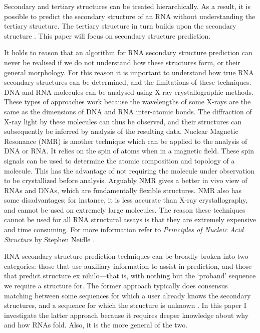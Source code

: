 \documentclass{cshonours}
\begin{document}
Secondary and tertiary structures can be treated hierarchically. As a result, it is possible to predict the secondary structure of an RNA without understanding the tertiary structure. The tertiary structure in turn builds upon the secondary structure \cite{tinoco1999rna}. This paper will focus on secondary structure prediction.

It holds to reason that an algorithm for RNA secondary structure prediction can never be realised if we do not understand how these structures form, or their general morphology. For this reason it is important to understand how true RNA secondary structures can be determined, and the limitations of these techniques. DNA and RNA molecules can be analysed using X-ray crystallographic methods. These types of approaches work because the wavelengths of some X-rays are the same as the dimensions of DNA and RNA inter-atomic bonds. The diffraction of X-ray light by these molecules can thus be observed, and their structures can subsequently be inferred by analysis of the resulting data. Nuclear Magnetic Resonance (NMR) is another technique which can be applied to the analysis of DNA or RNA. It relies on the spin of atoms when in a magnetic field. These spin signals can be used to determine the atomic composition and topology of a molecule. This has the advantage of not requiring the molecule under observation to be crystallized before analysis. Arguably NMR gives a better in vivo view of RNAs and DNAs, which are fundamentally flexible structures. NMR also has some disadvantages; for instance, it is less accurate than X-ray crystallography, and cannot be used on extremely large molecules. The reason these techniques cannot be used for all RNA structural assays is that they are extremely expensive and time consuming. For more information refer to \emph{Principles of Nucleic Acid Structure} by Stephen Neidle \cite{neidle2010principles}.


RNA secondary structure prediction techniques can be broadly broken into two categories: those that use auxiliary information to assist in prediction, and those that predict structure ex nihilo---that is, with nothing but the `proband' sequence we require a structure for. The former approach typically does consensus matching between some sequences for which a user already knows the secondary structures, and a sequence for which the structure is unknown \cite{hofacker2008rna}. In this paper I investigate the latter approach because it requires deeper knowledge about why and how RNAs fold. Also, it is the more general of the two.
\end{document}
